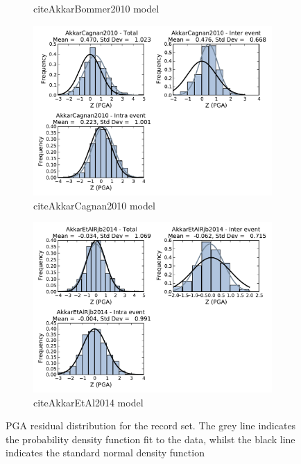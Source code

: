 \begin{figure}[htb]
\begin{subfigure}[b]{0.49\textwidth}
      \caption{citeAkkarBommer2010 model}
      \label{fig:pga_res_ab2010}
  \end{subfigure}
    \begin{subfigure}[b]{0.49\textwidth}
      \includegraphics[width=\textwidth]{./figures/residuals/AC2010_Residuals_PGA.pdf}
      \caption{citeAkkarCagnan2010 model}
      \label{fig:pga_res_ac2010}
  \end{subfigure}
      \begin{subfigure}[b]{0.49\textwidth}
      \includegraphics[width=\textwidth]{./figures/residuals/Akkar2014_Residuals_PGA.pdf}
     \caption{citeAkkarEtAl2014 model}
      \label{fig:pga_res_akkar2014}
  \end{subfigure}
  \caption{PGA residual distribution for the record set. The grey line indicates the probability density function fit to the data, whilst the black line indicates the standard normal density function}
  \label{fig:pga_resids}
\end{figure}


